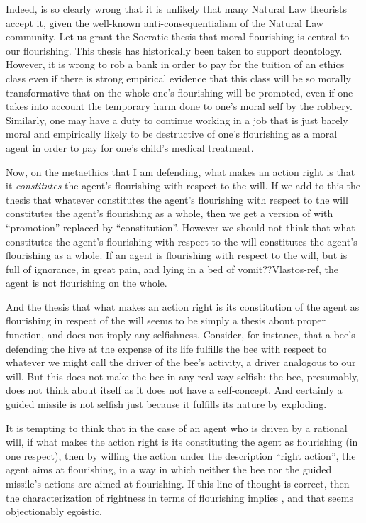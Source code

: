 Indeed,  is so clearly wrong that it is unlikely that many Natural Law theorists accept it, given the 
well-known anti-consequentialism of the Natural Law community. Let us grant the Socratic thesis that moral flourishing 
is central to our flourishing. This thesis has historically been taken to support deontology. However, it is wrong
to rob a bank in order to pay for the tuition of an ethics class even if there is strong empirical evidence that this 
class will be so morally transformative that on the whole one's flourishing will be promoted, even if one takes into account the
temporary harm done to one's moral self by the robbery. Similarly, one may have a duty to continue working in a job that is just barely
moral and empirically likely to be destructive of one's flourishing as a moral agent in order to pay for one's
child's medical treatment. 

Now, on the metaethics that I am defending, what makes an action right is that it \textit{constitutes} the agent's 
flourishing with respect to the will. If we add to this the thesis that whatever constitutes the agent's flourishing
with respect to the will constitutes the agent's flourishing as a whole, then we get a version of 
with ``promotion'' replaced by ``constitution''. However we should not think that what constitutes the agent's
flourishing with respect to the will constitutes the agent's flourishing as a whole. If an agent is flourishing with
respect to the will, but is full of ignorance, in great pain, and lying in a bed of vomit??Vlastos-ref, the agent
is not flourishing on the whole. 

And the thesis that what makes an action right is its constitution of the agent as flourishing in respect of the will
seems to be simply a thesis about proper function, and does not imply any selfishness. Consider, for instance, that a 
bee's defending the hive at the expense of its life fulfills the bee with respect to whatever we might call the driver of 
the bee's activity, a driver analogous to our will. But this does not make the bee in any real way selfish: the bee,
presumably, does not think about itself as it does not have a self-concept. 
And certainly a guided missile is not selfish just because it fulfills its nature by exploding.

It is tempting to think that in the case of an agent who is driven by a rational will, if what makes the action 
right is its constituting the agent as flourishing (in one respect), then by willing the action under the
description ``right action'', the agent aims at flourishing, in a way in which neither the bee nor the guided missile's
actions are aimed at flourishing. If this line of thought is correct, then the characterization of rightness in terms of 
flourishing implies , and that seems objectionably egoistic.

